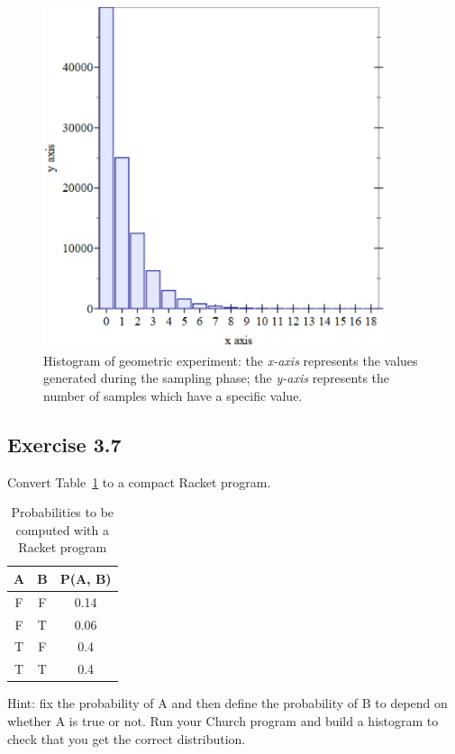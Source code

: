 \begin{figure}[h]
    \centering
    \includegraphics[width=10cm]{images/3.5.png}
    \caption{
        Histogram of geometric experiment: the \textit{x-axis} represents the values generated during the sampling phase; 
        the \textit{y-axis} represents the number of samples which have a specific value.
    }
    \label{fig:3-5}
\end{figure}


\subsection*{Exercise 3.7}
Convert Table~\ref{tab:es3-7} to a compact Racket program.
\begin{table}[H]
    \begin{center}
        \begin{tabular}{ccc}
            \hline
            A & B & P(A, B) \\
            \hline
            F & F & 0.14 \\
            F & T & 0.06 \\
            T & F & 0.4 \\
            T & T & 0.4 \\
            \hline
        \end{tabular}
    \end{center}
    \caption{Probabilities to be computed with a Racket program}
    \label{tab:es3-7}
\end{table}

\noindent Hint: fix the probability of A and then define the probability of B to depend on whether A is true or not. 
Run your Church program and build a histogram to check that you get the correct distribution.

